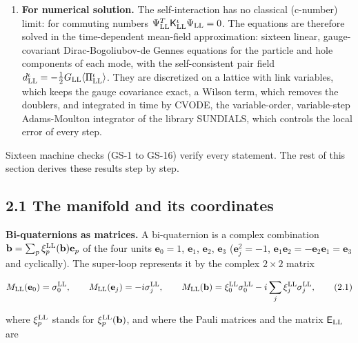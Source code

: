 \documentclass[
  10pt,
]{article}
\begin{document}
\begin{enumerate}
  Dirac operator is the right multiplication of the spinor charges by
  the frame bi-quaternions: \(\sum_p\gamma^p_{\rm LL}\nabla^{\rm LL}_p\)
  acts on the spinor charge \(\mathbf b^+_{\rm LL}\mathbf e_4\) as
  \(\sum_pR^{\rm LL}_{\mathbf f_p}\nabla^{\rm LL}_p\).
\item
  \textbf{For numerical solution.} The self-interaction has no classical
  (c-number) limit: for commuting numbers
  \(\Psi^T_{\rm LL}\mathsf K^\iota_{\rm LL}\Psi_{\rm LL}=0\). The
  equations are therefore solved in the time-dependent mean-field
  approximation: sixteen linear, gauge-covariant Dirac-Bogoliubov-de
  Gennes equations for the particle and hole components of each mode,
  with the self-consistent pair field
  \(d^\iota_{\rm LL}=-\tfrac12G_{\rm LL}\langle\Pi^\iota_{\rm LL}\rangle\).
  They are discretized on a lattice with link variables, which keeps the
  gauge covariance exact, a Wilson term, which removes the doublers, and
  integrated in time by CVODE, the variable-order, variable-step
  Adams-Moulton integrator of the library SUNDIALS, which controls the
  local error of every step.
\end{enumerate}

Sixteen machine checks (GS-1 to GS-16) verify every statement. The rest
of this section derives these results step by step.

\hypertarget{the-manifold-and-its-coordinates}{%
\subsection{2.1 The manifold and its
coordinates}\label{the-manifold-and-its-coordinates}}

\textbf{Bi-quaternions as matrices.} A bi-quaternion is a complex
combination \(\mathbf b=\sum_p\xi^{\rm LL}_p(\mathbf b)\mathbf e_p\) of
the four units \(\mathbf e_0=1\), \(\mathbf e_1\), \(\mathbf e_2\),
\(\mathbf e_3\) (\(\mathbf e_j^2=-1\),
\(\mathbf e_1\mathbf e_2=-\mathbf e_2\mathbf e_1=\mathbf e_3\) and
cyclically). The super-loop represents it by the complex \(2\times2\)
matrix

\[M_{\rm LL}(\mathbf e_0)=\sigma^{\rm LL}_0,\qquad M_{\rm LL}(\mathbf e_j)=-i\sigma^{\rm LL}_j,\qquad M_{\rm LL}(\mathbf b)=\xi^{\rm LL}_0\sigma^{\rm LL}_0-i\sum_j\xi^{\rm LL}_j\sigma^{\rm LL}_j,\tag{2.1}\]

where \(\xi^{\rm LL}_p\) stands for \(\xi^{\rm LL}_p(\mathbf b)\), and
where the Pauli matrices and the matrix \(\mathsf E_{\rm LL}\) are
\end{document}
